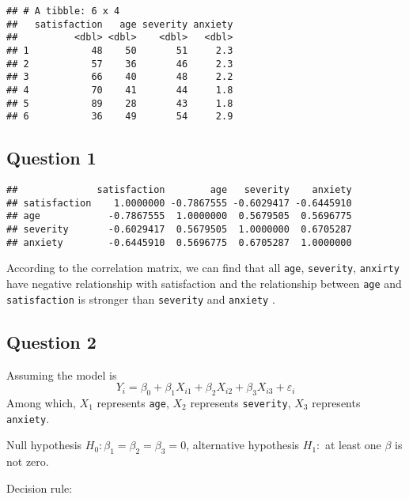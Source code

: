 \documentclass[]{article}
\newenvironment{Shaded}{\begin{snugshade}}{\end{snugshade}}
\newcommand{\KeywordTok}[1]{\textcolor[rgb]{0.13,0.29,0.53}{\textbf{#1}}}
\newcommand{\StringTok}[1]{\textcolor[rgb]{0.31,0.60,0.02}{#1}}
\newcommand{\OperatorTok}[1]{\textcolor[rgb]{0.81,0.36,0.00}{\textbf{#1}}}
\newcommand{\NormalTok}[1]{#1}
\begin{document}
\begin{verbatim}
## # A tibble: 6 x 4
##   satisfaction   age severity anxiety
##          <dbl> <dbl>    <dbl>   <dbl>
## 1           48    50       51     2.3
## 2           57    36       46     2.3
## 3           66    40       48     2.2
## 4           70    41       44     1.8
## 5           89    28       43     1.8
## 6           36    49       54     2.9
\end{verbatim}

\subsection{Question 1}\label{question-1-2}

\begin{Shaded}
\end{Shaded}

\begin{verbatim}
##              satisfaction        age   severity    anxiety
## satisfaction    1.0000000 -0.7867555 -0.6029417 -0.6445910
## age            -0.7867555  1.0000000  0.5679505  0.5696775
## severity       -0.6029417  0.5679505  1.0000000  0.6705287
## anxiety        -0.6445910  0.5696775  0.6705287  1.0000000
\end{verbatim}

According to the correlation matrix, we can find that all \texttt{age},
\texttt{severity}, \texttt{anxirty} have negative relationship with
satisfaction and the relationship between \texttt{age} and
\texttt{satisfaction} is stronger than \texttt{severity} and
\texttt{anxiety} .

\subsection{Question 2}\label{question-2-2}

Assuming the model is
\[ Y_i = \beta_0 + \beta_1X_{i1} + \beta_2X_{i2} + \beta_3X_{i3} + \varepsilon_i \]
Among which, \(X_1\) represents \texttt{age}, \(X_2\) represents
\texttt{severity}, \(X_3\) represents \texttt{anxiety}.

Null hypothesis \(H_0 : \beta_1 = \beta_2 = \beta_3 =0\), alternative
hypothesis \(H_1 :\) at least one \(\beta\) is not zero.

Decision rule:
\end{document}
